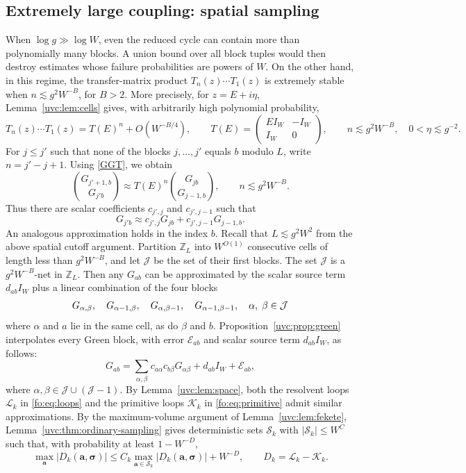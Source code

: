 \documentclass[11pt]{article}
\numberwithin{equation}{section}
\theoremstyle{remark}
\newcommand{\cL}{\mathcal L}
\newcommand{\cK}{\mathcal K}
\begin{document}
\subsection{Extremely large coupling: spatial sampling}
When $\log g\gg\log W$, even the reduced cycle can contain more
than polynomially many blocks. A union bound over all block tuples
would then destroy estimates whose failure probabilities are powers
of $W$. On the other hand, in this regime, the transfer-matrix product
$T_n(z)\cdots T_1(z)$ is extremely stable when $n\lesssim g^2W^{-B}$,
for $B>2$. More precisely, for $z=E+i\eta$, Lemma~\ref{uvc:lem:cells}
gives, with arbitrarily high polynomial probability,
\[
 T_n(z)\cdots T_1(z)=T(E)^n+O(W^{-B/4}),\qquad
 T(E)=\begin{pmatrix}EI_W&-I_W\\I_W&0\end{pmatrix},
 \qquad n\lesssim g^2W^{-B},\quad 0<\eta\lesssim g^{-2}.
\]
For $j\le j'$ such that none of the blocks $j,\ldots,j'$ equals $b$
modulo $L$, write $n=j'-j+1$.
Using \eqref{GGT}, we obtain
\[
 \binom{G_{j'+1,b}}{G_{j'b}}
 \approx T(E)^n\binom{G_{jb}}{G_{j-1,b}},
 \qquad n\lesssim g^2W^{-B}.
\]
Thus there are scalar coefficients $c_{j',j}$ and $c_{j',j-1}$ such that
\[
 G_{j'b}\approx c_{j',j}G_{jb}+c_{j',j-1}G_{j-1,b}.
\]
An analogous approximation holds in the index $b$. Recall that
$L\lesssim g^2W^2$ from the above spatial cutoff argument. Partition $\mathbb Z_L$
into $W^{O(1)}$ consecutive cells of length less than $g^2W^{-B}$,
and let $\mathcal J$ be the set of their first blocks. The set
$\mathcal J$ is a $g^2W^{-B}$-net in $\mathbb Z_L$. Then any
$G_{ab}$ can be approximated by the scalar source term $d_{ab}I_W$
plus a linear combination of the four blocks
\[
 G_{\alpha,\beta},\quad G_{\alpha-1,\beta},\quad
 G_{\alpha,\beta-1},\quad G_{\alpha-1,\beta-1},\quad \alpha,\; \beta \in {\cal J}
\] 
where $\alpha$ and $a$ lie in the same cell, as do $\beta$ and $b$.
Proposition~\ref{uvc:prop:green}
interpolates every Green block, with error $\mathcal E_{ab}$ and scalar source
term $d_{ab}I_W$, as follows:
\[
 G_{ab}
 =\sum_{\alpha,\beta}c_{a\alpha}c_{b\beta}G_{\alpha\beta}
       +d_{ab}I_W+\mathcal E_{ab},
\]
where $\alpha,\beta\in\mathcal J\cup(\mathcal J-1)$.
By Lemma~\ref{uvc:lem:space}, both the resolvent loops $\cL_k$ in
\eqref{fo:eq:loops} and the primitive loops $\cK_k$ in
\eqref{fo:eq:primitive} admit similar approximations.
By the maximum-volume argument of Lemma~\ref{uvc:lem:fekete},
Lemma~\ref{uvc:thm:ordinary-sampling} gives deterministic sets $\mathcal S_k$
with $|\mathcal S_k|\le W^C$ such that, with probability at least $1-W^{-D}$,
\[
 \max_{\boldsymbol a}|D_k(\boldsymbol a,\boldsymbol\sigma)|
 \le C_k\max_{\boldsymbol a\in\mathcal S_k}
       |D_k(\boldsymbol a,\boldsymbol\sigma)|+W^{-D},
 \qquad D_k=\cL_k-\cK_k.
\]
\end{document}
